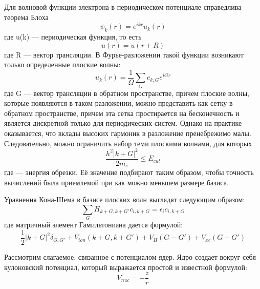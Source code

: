 	Для волновой функции электрона в периодическом потенциале справедлива теорема Блоха
 	\begin{equation}
  \label{eq:equation12}
\psi_k(r)=e^{ikr}u_k(r)
\end{equation}
где u(k) — периодическая функция, то есть
 	\begin{equation}
  \label{eq:equation13}
u(r)=u(r+R)
\end{equation}
где R — вектор трансляции. В Фурье-разложении такой функции возникают только определенные плоские  волны:
 	\begin{equation}
  \label{eq:equation14}
u_k(r)=\frac{1}{\Omega}\sum_Gc_{k,G}e^{iGr}
\end{equation}
где G — вектор трансляции в обратном пространстве, причем плоские волны, которые появляются в таком разложении, можно представить как сетку в обратном пространстве, причем эта сетка простирается на бесконечность и является дискретной только для периодических систем.  Однако на практике оказывается, что вклады высоких гармоник в разложение пренебрежимо малы. Следовательно, можно ограничить набор теми плоскими волнами, для которых
 	\begin{equation}
  \label{eq:equation15}
\frac{h^2|k+G|^2}{2m_e}\le E_{cut}
\end{equation}
где   — энергия обрезки. Её значение подбирают таким образом, чтобы точность вычислений была приемлемой при как можно меньшем размере базиса.
	
	Уравнения Кона-Шема в базисе плоских волн выглядят следующим образом:
 	\begin{equation}
  \label{eq:equation16}
\sum_GH_{k+G,k+G'}c_{i,k+G}=\epsilon_ic_{i,k+G}
\end{equation}
где матричный элемент Гамильтониана дается формулой:
 	\begin{equation}
  \label{eq:equation17}
\frac{1}{2}|k+G|^2\delta_{G,G'}+V_{ion}(k+G,k+G')+V_H(G-G')+V_{xc}(G+G')
\end{equation}
	
	Рассмотрим слагаемое, связанное с потенциалом ядер. Ядро создает вокруг себя кулоновский потенциал, который выражается простой и известной формулой: 
 	\begin{equation}
  \label{eq:equation18}
V_{nuc}=-\frac{z}{r}
\end{equation}

